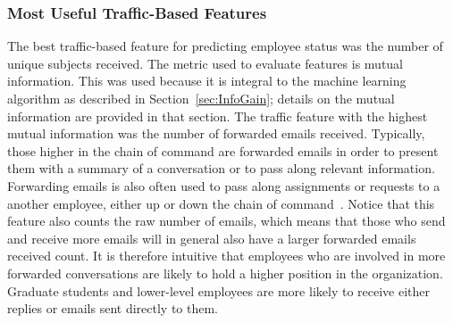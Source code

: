 \documentclass[12pt]{report}
\begin{document}
\subsubsection{Most Useful Traffic-Based Features}
The best traffic-based feature for predicting employee status was the number of unique subjects received.
The metric used to evaluate features is mutual information.
This was used because it is integral to the machine learning algorithm as described in Section~\ref{sec:InfoGain}; details on the mutual information are provided in that section.
The traffic feature with the highest mutual information was the number of forwarded emails received.
Typically, those higher in the chain of command are forwarded emails in order to present them with a summary of a conversation or to pass along relevant information.
Forwarding emails is also often used to pass along assignments or requests to a another employee, either up or down the chain of command~\cite{bulow2016distant}.
Notice that this feature also counts the raw number of emails, which means that those who send and receive more emails will in general also have a larger forwarded emails received count.
It is therefore intuitive that employees who are involved in more forwarded conversations are likely to hold a higher position in the organization.
Graduate students and lower-level employees are more likely to receive either replies or emails sent directly to them.
\end{document}
